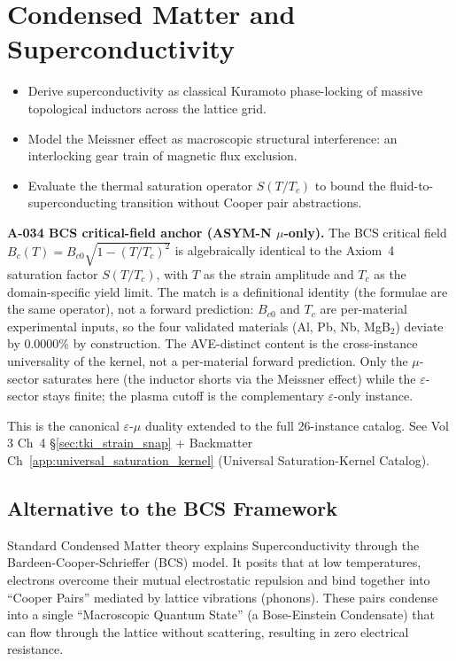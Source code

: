 \chapter{Condensed Matter and Superconductivity}
\label{ch:condensed_matter}


\begin{objectivebox}
\begin{itemize}
    \item Derive superconductivity as classical Kuramoto phase-locking of massive topological inductors across the lattice grid.
    \item Model the Meissner effect as macroscopic structural interference: an interlocking gear train of magnetic flux exclusion.
    \item Evaluate the thermal saturation operator $S(T/T_c)$ to bound the fluid-to-superconducting transition without Cooper pair abstractions.
\end{itemize}
\end{objectivebox}

\textbf{A-034 BCS critical-field anchor (ASYM-N $\mu$-only).} The BCS
critical field $B_c(T) = B_{c0}\sqrt{1 - (T/T_c)^2}$ is algebraically
identical to the Axiom~4 saturation factor $S(T/T_c)$, with $T$ as the
strain amplitude and $T_c$ as the domain-specific yield limit. The match
is a definitional identity (the formulae are the same operator), not a
forward prediction: $B_{c0}$ and $T_c$ are per-material experimental
inputs, so the four validated materials (Al, Pb, Nb, MgB$_2$) deviate by
$0.0000\%$ by construction. The AVE-distinct content is the cross-instance
universality of the kernel, not a per-material forward prediction. Only the
$\mu$-sector saturates here (the inductor shorts via the Meissner effect)
while the $\varepsilon$-sector stays finite; the plasma cutoff is the
complementary $\varepsilon$-only instance.

This is the canonical $\varepsilon$-$\mu$ duality extended to the full
26-instance catalog. See Vol 3 Ch~4 \S\ref{sec:tki_strain_snap} +
Backmatter Ch~\ref{app:universal_saturation_kernel} (Universal
Saturation-Kernel Catalog).

\section{Alternative to the BCS Framework}
Standard Condensed Matter theory explains Superconductivity through the Bardeen-Cooper-Schrieffer (BCS) model. It posits that at low temperatures, electrons overcome their mutual electrostatic repulsion and bind together into ``Cooper Pairs'' mediated by lattice vibrations (phonons). These pairs condense into a single ``Macroscopic Quantum State'' (a Bose-Einstein Condensate) that can flow through the lattice without scattering, resulting in zero electrical resistance.

